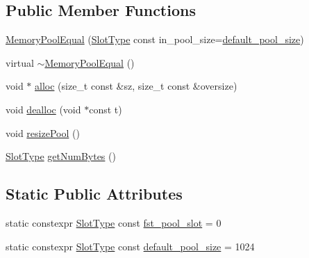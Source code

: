 \subsection*{Public Member Functions}
\begin{DoxyCompactItemize}
\item 
\hyperlink{structvt_1_1pool_1_1_memory_pool_equal_a588ccd66ce55b16d85ee47a739ec7cdd}{Memory\+Pool\+Equal} (\hyperlink{structvt_1_1pool_1_1_memory_pool_equal_a101fdcb943d0cb0863cf17655e0b4e1c}{Slot\+Type} const in\+\_\+pool\+\_\+size=\hyperlink{structvt_1_1pool_1_1_memory_pool_equal_a67dae02a7795b182a7302b9eb34924e7}{default\+\_\+pool\+\_\+size})
\item 
virtual \hyperlink{structvt_1_1pool_1_1_memory_pool_equal_a3639b62858bef876bf6f8a51cfdb7212}{$\sim$\+Memory\+Pool\+Equal} ()
\item 
void $\ast$ \hyperlink{structvt_1_1pool_1_1_memory_pool_equal_a070cb7e7f56cde226fe95a71832d7deb}{alloc} (size\+\_\+t const \&sz, size\+\_\+t const \&oversize)
\item 
void \hyperlink{structvt_1_1pool_1_1_memory_pool_equal_af02c22884cf082406c7f5dd00d9b77c8}{dealloc} (void $\ast$const t)
\item 
void \hyperlink{structvt_1_1pool_1_1_memory_pool_equal_acb03d02014eaebd24522525b059d4fb4}{resize\+Pool} ()
\item 
\hyperlink{structvt_1_1pool_1_1_memory_pool_equal_a101fdcb943d0cb0863cf17655e0b4e1c}{Slot\+Type} \hyperlink{structvt_1_1pool_1_1_memory_pool_equal_a5a760235c3429f60ba394d166ee0e26b}{get\+Num\+Bytes} ()
\end{DoxyCompactItemize}
\subsection*{Static Public Attributes}
\begin{DoxyCompactItemize}
\item 
static constexpr \hyperlink{structvt_1_1pool_1_1_memory_pool_equal_a101fdcb943d0cb0863cf17655e0b4e1c}{Slot\+Type} const \hyperlink{structvt_1_1pool_1_1_memory_pool_equal_ae0435baf515fefccc015b600357bc6bb}{fst\+\_\+pool\+\_\+slot} = 0
\item 
static constexpr \hyperlink{structvt_1_1pool_1_1_memory_pool_equal_a101fdcb943d0cb0863cf17655e0b4e1c}{Slot\+Type} const \hyperlink{structvt_1_1pool_1_1_memory_pool_equal_a67dae02a7795b182a7302b9eb34924e7}{default\+\_\+pool\+\_\+size} = 1024
\end{DoxyCompactItemize}
